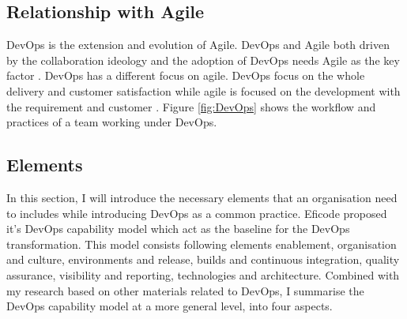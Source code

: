 \subsection{Relationship with Agile}
DevOps is the extension and evolution \cite{lwakatare2016relationship}\cite{leite2019survey} of Agile. DevOps and Agile both driven by the collaboration ideology and the adoption of DevOps needs Agile as the key factor \cite{lwakatare2016relationship}. DevOps has a different focus on agile. DevOps focus on the whole delivery and customer satisfaction while agile is focused on the development with the requirement and customer \cite{buchanan2015agile}. Figure \ref{fig:DevOps} shows the workflow and practices of a team working under DevOps.
\subsection{Elements}
In this section, I will introduce the necessary elements that an organisation need to includes while introducing DevOps as a common practice.
Eficode proposed it's DevOps capability model which act as the baseline for the DevOps transformation. This model consists following elements enablement, organisation and culture, environments and release, builds and continuous integration,  quality assurance, visibility and reporting, technologies and architecture. Combined with my research based on other materials related to DevOps, I summarise the DevOps capability model at a more general level, into four aspects.
